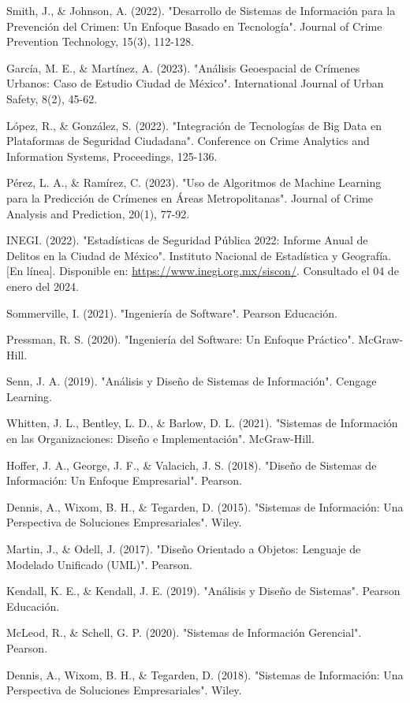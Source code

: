 \documentclass{article}
\begin{document}
\begin{bracketed}
    \item Smith, J., \& Johnson, A. (2022). "Desarrollo de Sistemas de Información para la Prevención del Crimen: Un Enfoque Basado en Tecnología". Journal of Crime Prevention Technology, 15(3), 112-128.
    \item García, M. E., \& Martínez, A. (2023). "Análisis Geoespacial de Crímenes Urbanos: Caso de Estudio Ciudad de México". International Journal of Urban Safety, 8(2), 45-62.
    \item López, R., \& González, S. (2022). "Integración de Tecnologías de Big Data en Plataformas de Seguridad Ciudadana". Conference on Crime Analytics and Information Systems, Proceedings, 125-136.
    \item Pérez, L. A., \& Ramírez, C. (2023). "Uso de Algoritmos de Machine Learning para la Predicción de Crímenes en Áreas Metropolitanas". Journal of Crime Analysis and Prediction, 20(1), 77-92.
    \item INEGI. (2022). "Estadísticas de Seguridad Pública 2022: Informe Anual de Delitos en la Ciudad de México". Instituto Nacional de Estadística y Geografía. [En línea]. Disponible en: \url{https://www.inegi.org.mx/siscon/}. Consultado el 04 de enero del 2024.

    \item Sommerville, I. (2021). "Ingeniería de Software". Pearson Educación.
    \item Pressman, R. S. (2020). "Ingeniería del Software: Un Enfoque Práctico". McGraw-Hill.
    \item Senn, J. A. (2019). "Análisis y Diseño de Sistemas de Información". Cengage Learning.
    \item Whitten, J. L., Bentley, L. D., \& Barlow, D. L. (2021). "Sistemas de Información en las Organizaciones: Diseño e Implementación". McGraw-Hill.
    \item Hoffer, J. A., George, J. F., \& Valacich, J. S. (2018). "Diseño de Sistemas de Información: Un Enfoque Empresarial". Pearson.
    \item Dennis, A., Wixom, B. H., \& Tegarden, D. (2015). "Sistemas de Información: Una Perspectiva de Soluciones Empresariales". Wiley.
    \item Martin, J., \& Odell, J. (2017). "Diseño Orientado a Objetos: Lenguaje de Modelado Unificado (UML)". Pearson.
    \item Kendall, K. E., \& Kendall, J. E. (2019). "Análisis y Diseño de Sistemas". Pearson Educación.
    \item McLeod, R., \& Schell, G. P. (2020). "Sistemas de Información Gerencial". Pearson.
    \item Dennis, A., Wixom, B. H., \& Tegarden, D. (2018). "Sistemas de Información: Una Perspectiva de Soluciones Empresariales". Wiley.
\end{bracketed}
\end{document}
